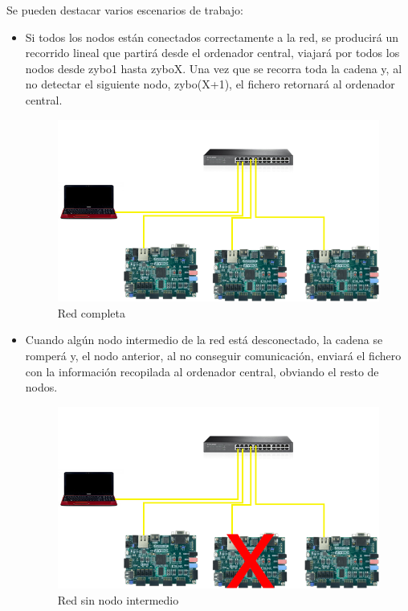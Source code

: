 Se pueden destacar varios escenarios de trabajo:
\begin{itemize}
	\item Si todos los nodos están conectados correctamente a la red, se producirá un recorrido lineal que partirá desde el ordenador central, viajará por todos los nodos desde zybo1 hasta zyboX. Una vez que se recorra toda la cadena y, al no detectar el siguiente nodo, zybo(X+1), el fichero retornará al ordenador central.
	\begin{figure}[h]
		\centering
		\includegraphics[scale=0.5]{Epilogo/RedCompleta.png}
		\caption{Red completa}
		\label{Red completa}
	\end{figure}
	\item Cuando algún nodo intermedio de la red está desconectado, la cadena se romperá y, el nodo anterior, al no conseguir comunicación, enviará el fichero con la información recopilada al ordenador central, obviando el resto de nodos.
	\begin{figure}[h]
		\centering
		\includegraphics[scale=0.5]{Epilogo/RedSinNodo2.png}
		\caption{Red sin nodo intermedio}
		\label{Red sin nodo intermedio}

\end{figure}
\end{itemize}
